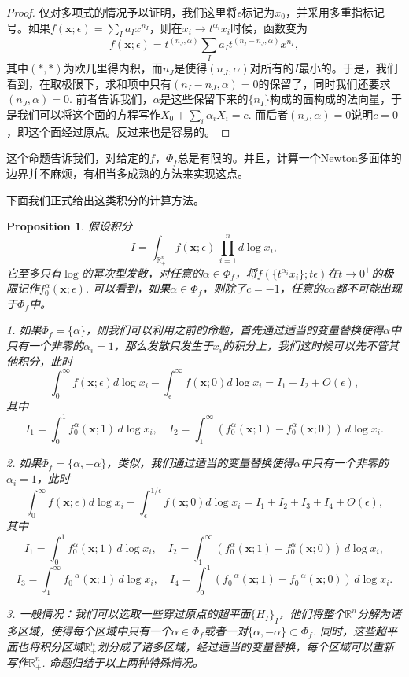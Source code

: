 \documentclass[12pt]{article}
\theoremstyle{definition}
\theoremstyle{plain}
\newtheorem{pro}[para]{Proposition}
\begin{document}
\begin{proof}
仅对多项式的情况予以证明，我们这里将$\epsilon$标记为$x_0$，并采用多重指标记号。如果$f(\mathbf{x};\epsilon)=\sum_I a_I x^{n_I}$，则在$x_i\to t^{\alpha_i}x_i$时候，函数变为
\[
	f(\mathbf{x};\epsilon)=t^{(n_J,\alpha)}\sum_I a_I t^{(n_I-n_J,\alpha)}x^{n_I},
\]
其中$(*,*)$为欧几里得内积，而$n_J$是使得$(n_J,\alpha)$对所有的$I$最小的。于是，我们看到，在取极限下，求和项中只有$(n_I-n_J,\alpha)=0$的保留了，同时我们还要求$(n_J,\alpha)=0$. 前者告诉我们，$\alpha$是这些保留下来的$\{n_I\}$构成的面构成的法向量，于是我们可以将这个面的方程写作$X_0+\sum_{i}\alpha_i X_i=c$. 而后者$(n_J,\alpha)=0$说明$c=0$，即这个面经过原点。反过来也是容易的。
\end{proof}

这个命题告诉我们，对给定的$f$，$\Phi_f$总是有限的。并且，计算一个Newton多面体的边界并不麻烦，有相当多成熟的方法来实现这点。

下面我们正式给出这类积分的计算方法。

\begin{pro}
假设积分
	\[
		I=\int_{\mathbb R_+^n} f(\mathbf{x};\epsilon)\,\prod_{i=1}^n d\log x_i,
	\]
它至多只有$\log$的幂次型发散，对任意的$\alpha\in \Phi_f$，将$f(\{t^{\alpha_i}x_i\};t\epsilon)$在$t\to 0^+$的极限记作$f_0^\alpha(\mathbf{x};\epsilon)$. 可以看到，如果$\alpha\in \Phi_f$，则除了$c=-1$，任意的$c\alpha$都不可能出现于$\Phi_f$中。

1. 如果$\Phi_f=\{\alpha\}$，则我们可以利用之前的命题，首先通过适当的变量替换使得$\alpha$中只有一个非零的$\alpha_i=1$，那么发散只发生于$x_i$的积分上，我们这时候可以先不管其他积分，此时
\[
	\int_{0}^\infty f(\mathbf{x};\epsilon)d\log x_i-\int_{\epsilon}^\infty f(\mathbf{x};0)d\log x_i=I_1+I_2+O(\epsilon),
\]
其中
\[
	I_1=\int_{0}^1f_0^{\alpha}(\mathbf{x};1)\,d\log x_i,\quad I_2=\int_{1}^\infty (f^{\alpha}_0(\mathbf x;1)-f^{\alpha}_0(\mathbf x;0))\,d\log x_i.
\]

2. 如果$\Phi_f=\{\alpha,-\alpha\}$，类似，我们通过适当的变量替换使得$\alpha$中只有一个非零的$\alpha_i=1$，此时
\[
	\int_{0}^\infty f(\mathbf{x};\epsilon)d\log x_i-\int_{\epsilon}^{1/\epsilon} f(\mathbf{x};0)d\log x_i=I_1+I_2+I_3+I_4+O(\epsilon),
\]
其中
\[
	I_1=\int_{0}^1f_0^{\alpha}(\mathbf{x};1)\,d\log x_i,\quad I_2=\int_{1}^\infty (f^{\alpha}_0(\mathbf x;1)-f^{\alpha}_0(\mathbf x;0))\,d\log x_i,
\]
\[
	I_3=\int_{1}^\infty f_0^{-\alpha}(\mathbf{x};1)\,d\log x_i,\quad I_4=\int_{0}^1 (f^{-\alpha}_0(\mathbf x;1)-f^{-\alpha}_0(\mathbf x;0))\,d\log x_i.
\]

3. 一般情况：我们可以选取一些穿过原点的超平面$\{H_I\}_I$，他们将整个$\mathbb R^n$分解为诸多区域，使得每个区域中只有一个$\alpha\in \Phi_f$或者一对$\{\alpha,-\alpha\}\subset \Phi_f$. 同时，这些超平面也将积分区域$\mathbb R_+^n$划分成了诸多区域，经过适当的变量替换，每个区域可以重新写作$\mathbb R_+^n$. 命题归结于以上两种特殊情况。
\end{pro}
\end{document}
